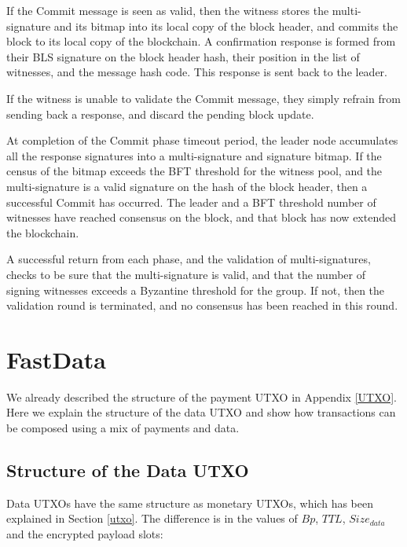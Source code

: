 \documentclass[a4paper, 10pt, conference]{ieeeconf}
\begin{document}
\begin{itemize}
{{	\item{If the Commit message is seen as valid, then the witness stores the multi-signature and its bitmap into its local copy of the block header, and commits the block to its local copy of the blockchain. A confirmation response is formed from their BLS signature on the block header hash, their position in the list of witnesses, and the message hash code. This response is sent back to the leader.}

	\item{If the witness is unable to validate the Commit message, they simply refrain from sending back a response, and discard the pending block update.}}

	\item{At completion of the Commit phase timeout period, the leader node accumulates all the response signatures into a multi-signature and signature bitmap. If the census of the bitmap exceeds the BFT threshold for the witness pool, and the multi-signature is a valid signature on the hash of the block header, then a successful Commit has occurred. The leader and a BFT threshold number of witnesses have reached consensus on the block, and that block has now extended the blockchain.}
	}
\end{itemize}

A successful return from each phase, and the validation of multi-signatures, checks to be sure that the multi-signature is valid, and that the number of signing witnesses exceeds a Byzantine threshold for the group. If not, then the validation round is terminated, and no consensus has been reached in this round.

\section{FastData}\label{FastDataAppendix}

We already described the structure of the payment UTXO in Appendix \ref{UTXO}. Here we explain the structure of the data UTXO and show how transactions can be composed using a mix of payments and data.

\subsection{Structure of the Data UTXO}

Data UTXOs have the same structure as monetary UTXOs, which has been explained in Section \ref{utxo}. The difference is in the values of $Bp$, $TTL$, $Size_{data}$ and the encrypted payload slots:
\end{document}
